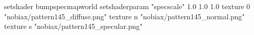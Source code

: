 setshader bumpspecmapworld
setshaderparam "specscale" 1.0 1.0 1.0
   texture 0 "nobiax/pattern145_diffuse.png"
   texture n "nobiax/pattern145_normal.png"
   texture s "nobiax/pattern145_specular.png"